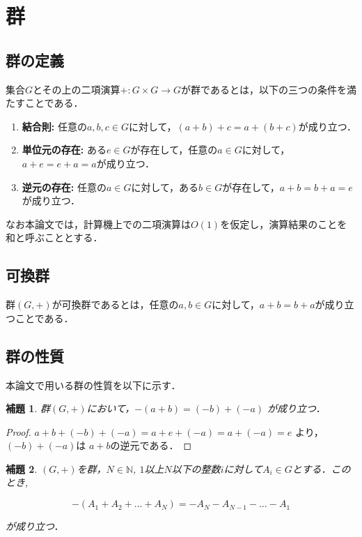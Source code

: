 \documentclass{jsreport}
\theoremstyle{plain} %
\newtheorem{lemma}{補題}
\theoremstyle{definition}
\begin{document}
\section{群}

\subsection{群の定義}

集合$G$とその上の二項演算$+: G \times G \to G$が群であるとは，以下の三つの条件を満たすことである．

\begin{enumerate}
    \item \textbf{結合則:} 任意の$a, b, c \in G$に対して，$(a + b) + c = a + (b + c)$が成り立つ．
    \item \textbf{単位元の存在:} ある$e \in G$が存在して，任意の$a \in G$に対して，$a + e = e + a = a$が成り立つ．
    \item \textbf{逆元の存在:} 任意の$a \in G$に対して，ある$b \in G$が存在して，$a + b = b + a = e$が成り立つ．
\end{enumerate}

なお本論文では，計算機上での二項演算は$O(1)$を仮定し，演算結果のことを和と呼ぶこととする．

\subsection{可換群}

群$(G, +)$が可換群であるとは，任意の$a, b \in G$に対して，$a + b = b + a$が成り立つことである．

\subsection{群の性質}

本論文で用いる群の性質を以下に示す．

\begin{lemma}
    群$(G, +)$において，$-(a+b) = (-b) + (-a)$ が成り立つ．
\end{lemma}

\begin{proof}
    $a + b + (-b) + (-a) = a + e + (-a) = a + (-a) = e$ より，$(-b) + (-a)$は $a + b$の逆元である．
\end{proof}

\begin{lemma}
    $(G, +)$を群，$N \in \mathbb{N}$, $1$以上$N$以下の整数$i$に対して$A_i \in G$とする．このとき,

    \begin{equation}
        -(A_1 + A_2 + \ldots + A_{N}) = -A_N - A_{N-1} - \ldots - A_1
    \end{equation}

    が成り立つ．
\end{lemma}
\end{document}
